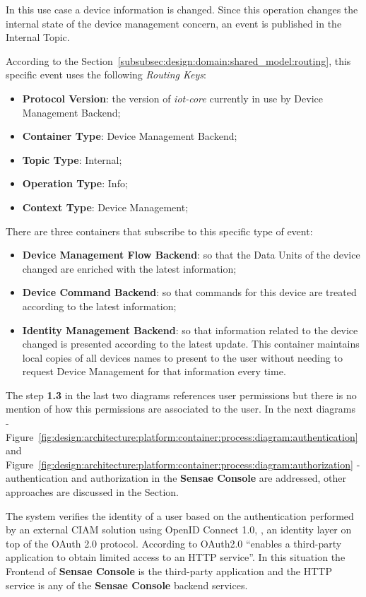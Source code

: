 In this use case a device information is changed. Since this operation changes the internal state of the device management concern, an event is published in the Internal Topic.

According to the Section~\ref{subsubsec:design:domain:shared_model:routing}, this specific event uses the following \textit{Routing Keys}:

\begin{itemize}
   \item \textbf{Protocol Version}: the version of \textit{iot-core} currently in use by Device Management Backend;
   \item \textbf{Container Type}: Device Management Backend;
   \item \textbf{Topic Type}: Internal;
   \item \textbf{Operation Type}: Info;
   \item \textbf{Context Type}: Device Management;
\end{itemize}

There are three containers that subscribe to this specific type of event:

\begin{itemize}
   \item \textbf{Device Management Flow Backend}: so that the Data Units of the device changed are enriched with the latest information;
   \item \textbf{Device Command Backend}: so that commands for this device are treated according to the latest information;
   \item \textbf{Identity Management Backend}: so that information related to the device changed is presented according to the latest update. This container maintains local copies of all devices names to present to the user without needing to request Device Management for that information every time.
\end{itemize}

The step \textbf{1.3} in the last two diagrams references user permissions but there is no mention of how this permissions are associated to the user. In the next diagrams - Figure~\ref{fig:design:architecture:platform:container:process:diagram:authentication} and Figure~\ref{fig:design:architecture:platform:container:process:diagram:authorization} - authentication and authorization in the \textbf{Sensae Console} are addressed, other approaches are discussed in the  Section.

The system verifies the identity of a user based on the authentication performed by an external \gls{CIAM} solution using OpenID Connect 1.0, \cite{openid}, an identity layer on top of the OAuth 2.0 protocol. According to \cite{oauth} OAuth2.0 ``enables a third-party application to obtain limited access to an HTTP service''. In this situation the Frontend of \textbf{Sensae Console} is the third-party application and the HTTP service is any of the \textbf{Sensae Console} backend services.

